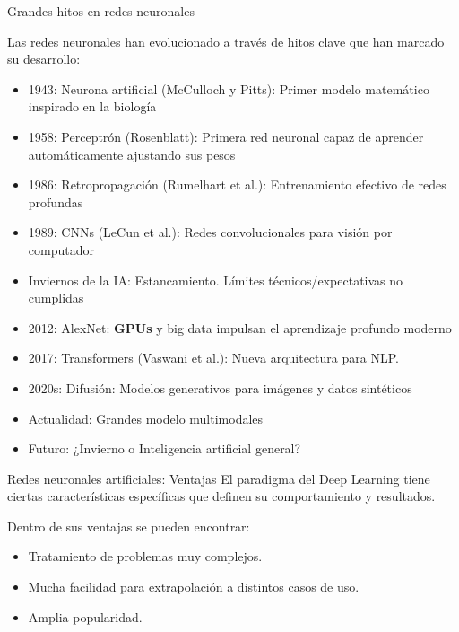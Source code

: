 \begin{frame}{Grandes hitos en redes neuronales}
\footnotesize{
Las redes neuronales han evolucionado a través de hitos clave que han marcado su desarrollo:

\begin{itemize}
    \item \alert{1943: Neurona artificial} (McCulloch y Pitts): Primer modelo matemático inspirado en la biología
    \item \alert{1958: Perceptrón} (Rosenblatt): Primera red neuronal capaz de aprender automáticamente ajustando sus pesos
    \item \alert{1986: Retropropagación} (Rumelhart et al.): Entrenamiento efectivo de redes profundas
    \item \alert{1989: CNNs} (LeCun et al.): Redes convolucionales para visión por computador
    \item \alert{Inviernos de la IA}: Estancamiento. Límites técnicos/expectativas no cumplidas
    \item \alert{2012: AlexNet}: \textbf{GPUs} y big data impulsan el aprendizaje profundo moderno
    \item \alert{2017: Transformers} (Vaswani et al.): Nueva arquitectura para NLP.
    \item \alert{2020s: Difusión}: Modelos generativos para imágenes y datos sintéticos
    \item \alert{Actualidad}: Grandes modelo multimodales
    \item \alert{Futuro}: ¿Invierno o Inteligencia artificial general?
\end{itemize}
}
\end{frame}

\begin{frame}{Redes neuronales artificiales: Ventajas}
El paradigma del Deep Learning tiene ciertas características \alert{específicas} que definen su comportamiento y resultados.

Dentro de sus \alert{ventajas} se pueden encontrar:
\begin{itemize}
    \item Tratamiento de problemas \alert{muy complejos}.
    \item Mucha facilidad para \alert{extrapolación} a distintos casos de uso.
    \item Amplia \alert{popularidad}.
\end{itemize}
\end{frame}

